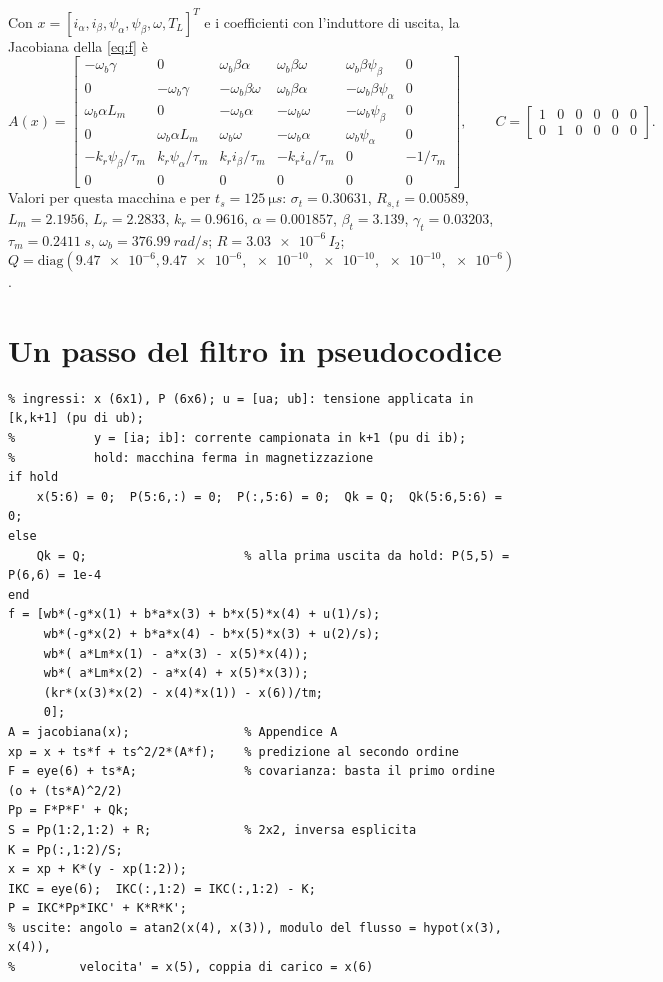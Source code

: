\documentclass[10pt,a4paper]{scrartcl}
\newcommand{\ts}{t_s}
\newcommand{\wb}{\omega_b}
\newcommand{\kr}{k_r}
\newcommand{\taum}{\tau_m}
\begin{document}
Con $x = [i_\alpha, i_\beta, \psi_\alpha, \psi_\beta, \omega, T_L]^T$ e i coefficienti con l'induttore di uscita, la Jacobiana della \eqref{eq:f} è
\begin{equation*}
A(x) =
\begin{bmatrix}
-\wb\gamma & 0 & \wb\beta\alpha & \wb\beta\omega & \wb\beta\psi_\beta & 0\\
0 & -\wb\gamma & -\wb\beta\omega & \wb\beta\alpha & -\wb\beta\psi_\alpha & 0\\
\wb\alpha L_m & 0 & -\wb\alpha & -\wb\omega & -\wb\psi_\beta & 0\\
0 & \wb\alpha L_m & \wb\omega & -\wb\alpha & \wb\psi_\alpha & 0\\
-\kr\psi_\beta/\taum & \kr\psi_\alpha/\taum & \kr i_\beta/\taum & -\kr i_\alpha/\taum & 0 & -1/\taum\\
0 & 0 & 0 & 0 & 0 & 0
\end{bmatrix},
\qquad
C = \begin{bmatrix} 1 & 0 & 0 & 0 & 0 & 0\\ 0 & 1 & 0 & 0 & 0 & 0\end{bmatrix}.
\end{equation*}
Valori per questa macchina e per $\ts = \SI{125}{\micro s}$: $\sigma_t = \num{0.30631}$, $R_{s,t} = \num{0.00589}$, $L_m = \num{2.1956}$, $L_r = \num{2.2833}$, $\kr = \num{0.9616}$, $\alpha = \num{0.001857}$, $\beta_t = \num{3.139}$, $\gamma_t = \num{0.03203}$, $\taum = \SI{0.2411}{s}$, $\wb = \SI{376.99}{rad/s}$; $R = \num{3.03e-6}\,I_2$; $Q = \mathrm{diag}(\num{9.47e-6}, \num{9.47e-6}, \num{e-10}, \num{e-10}, \num{e-10}, \num{e-6})$.

\section{Un passo del filtro in pseudocodice}
\label{app:pseudocodice}

\begin{small}
\begin{verbatim}
% ingressi: x (6x1), P (6x6); u = [ua; ub]: tensione applicata in [k,k+1] (pu di ub);
%           y = [ia; ib]: corrente campionata in k+1 (pu di ib);
%           hold: macchina ferma in magnetizzazione
if hold
    x(5:6) = 0;  P(5:6,:) = 0;  P(:,5:6) = 0;  Qk = Q;  Qk(5:6,5:6) = 0;
else
    Qk = Q;                      % alla prima uscita da hold: P(5,5) = P(6,6) = 1e-4
end
f = [wb*(-g*x(1) + b*a*x(3) + b*x(5)*x(4) + u(1)/s);
     wb*(-g*x(2) + b*a*x(4) - b*x(5)*x(3) + u(2)/s);
     wb*( a*Lm*x(1) - a*x(3) - x(5)*x(4));
     wb*( a*Lm*x(2) - a*x(4) + x(5)*x(3));
     (kr*(x(3)*x(2) - x(4)*x(1)) - x(6))/tm;
     0];
A = jacobiana(x);                % Appendice A
xp = x + ts*f + ts^2/2*(A*f);    % predizione al secondo ordine
F = eye(6) + ts*A;               % covarianza: basta il primo ordine (o + (ts*A)^2/2)
Pp = F*P*F' + Qk;
S = Pp(1:2,1:2) + R;             % 2x2, inversa esplicita
K = Pp(:,1:2)/S;
x = xp + K*(y - xp(1:2));
IKC = eye(6);  IKC(:,1:2) = IKC(:,1:2) - K;
P = IKC*Pp*IKC' + K*R*K';
% uscite: angolo = atan2(x(4), x(3)), modulo del flusso = hypot(x(3), x(4)),
%         velocita' = x(5), coppia di carico = x(6)
\end{verbatim}
\end{small}
\end{document}
